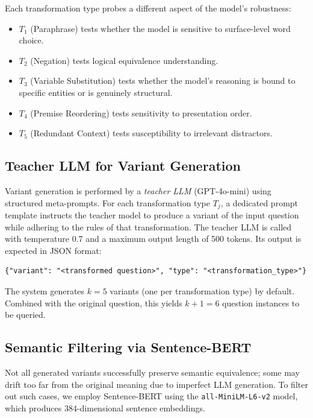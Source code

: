 \noindent
Each transformation type probes a different aspect of the model's robustness:

\begin{itemize}
    \item $T_1$ (Paraphrase) tests whether the model is sensitive to surface-level word choice.
    \item $T_2$ (Negation) tests logical equivalence understanding.
    \item $T_3$ (Variable Substitution) tests whether the model's reasoning is bound to specific entities or is genuinely structural.
    \item $T_4$ (Premise Reordering) tests sensitivity to presentation order.
    \item $T_5$ (Redundant Context) tests susceptibility to irrelevant distractors.
\end{itemize}

\subsection{Teacher LLM for Variant Generation}

Variant generation is performed by a \emph{teacher LLM} (GPT-4o-mini) using structured meta-prompts. For each transformation type $T_j$, a dedicated prompt template instructs the teacher model to produce a variant of the input question while adhering to the rules of that transformation. The teacher LLM is called with temperature 0.7 and a maximum output length of 500 tokens. Its output is expected in JSON format:

\begin{verbatim}
{"variant": "<transformed question>", "type": "<transformation_type>"}
\end{verbatim}

\noindent
The system generates $k = 5$ variants (one per transformation type) by default. Combined with the original question, this yields $k + 1 = 6$ question instances to be queried.

\subsection{Semantic Filtering via Sentence-BERT}

Not all generated variants successfully preserve semantic equivalence; some may drift too far from the original meaning due to imperfect LLM generation. To filter out such cases, we employ Sentence-BERT \cite{reimers2019sentence} using the \texttt{all-MiniLM-L6-v2} model, which produces 384-dimensional sentence embeddings.

